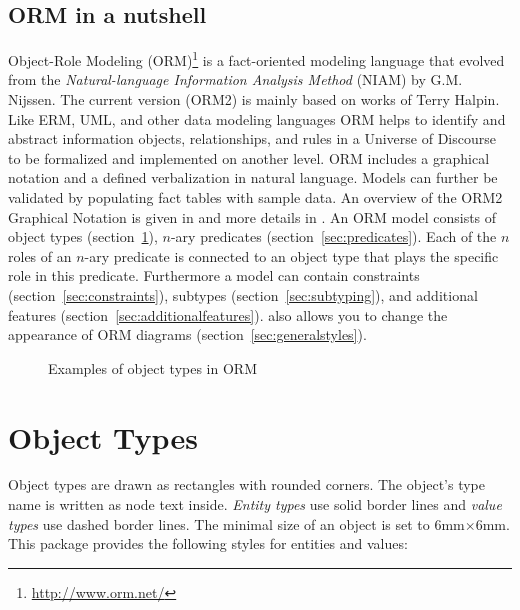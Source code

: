 \documentclass[a4paper,10pt]{article}
\begin{document}
\subsection*{ORM in a nutshell}
Object-Role Modeling (ORM)\footnote{\url{http://www.orm.net/}} is a fact-oriented modeling language that evolved from the \textit{Natural-language Information Analysis Method} (NIAM) by G.M. Nijssen. The current version (ORM2) is mainly based on works of Terry Halpin. Like ERM, UML, and other data modeling languages ORM helps to identify and abstract information objects, relationships, and rules in a Universe of Discourse to be formalized and implemented on another level. ORM includes a graphical notation and a defined verbalization in natural language. Models can further be validated by populating fact tables with sample data. An overview of the ORM2 Graphical Notation is given in \cite{Halpin2005} and more details in \cite{Halpin2008}. An ORM model consists of object types (section~\ref{sec:objecttypes}), $n$-ary predicates  (section~\ref{sec:predicates}). Each of the $n$ roles of an $n$-ary predicate is connected to an object type that plays the specific role in this predicate. Furthermore a model can contain constraints (section~\ref{sec:constraints}), subtypes (section~\ref{sec:subtyping}), and additional features (section~\ref{sec:additionalfeatures}). \tkzorm also allows you to change the appearance of ORM diagrams (section~\ref{sec:generalstyles}).

\begin{figure}[ht]
  \caption{Examples of object types in ORM}
\end{figure}

\pagebreak
\section{Object Types}
\label{sec:objecttypes}
Object types are drawn as rectangles with rounded corners. The object's type name is written as node text inside. \emph{Entity types} use solid border lines and \emph{value types} use dashed border lines. The minimal size of an object is set to 6mm$\times$6mm. This package provides the following styles for entities and values:
\end{document}
